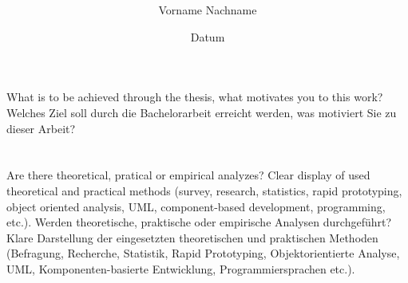 \documentclass[a4paper,10pt,english]{INSOexpose}
\title{
	\langchooser{
		Preliminary thesis title
	}{
		Vorl\"aufiger Arbeitstitel der Arbeit
	}
}
\author{Vorname Nachname}
\date{Datum}
\begin{document}
\maketitle

\section{}


\section{}

\langchooser
{
	What is to be achieved through the thesis, what motivates you to this work?
}
{
	Welches Ziel soll durch die Bachelorarbeit erreicht werden, was motiviert Sie zu dieser Arbeit? 
}

\section{}

\langchooser
{
	Are there theoretical, pratical or empirical analyzes? Clear display of used theoretical and practical methods (survey, research, statistics, rapid prototyping, object oriented analysis, UML, component-based development, programming, etc.).
}
{
	Werden theoretische, praktische oder empirische Analysen durchgeführt? Klare Darstellung der eingesetzten theoretischen und praktischen Methoden (Befragung, Recherche, Statistik, 	Rapid Prototyping, Objektorientierte Analyse, UML, Komponenten-basierte Entwicklung, Programmiersprachen etc.).
}

\end{document}
